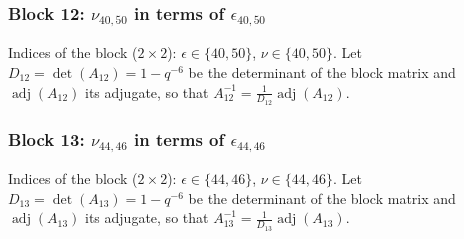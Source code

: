 \subsubsection{Block 12: $\nu_{40, 50}$ in terms of $\epsilon_{40, 50}$}
Indices of the block ($2\times 2$): $\epsilon \in \{40, 50\}$, $\nu \in \{40, 50\}$.
Let $D_{12} = \det(A_{12}) = 1-q^{-6}$ be the determinant of the block matrix and $\operatorname{adj}(A_{12})$ its adjugate, so that $A_{12}^{-1} = \frac{1}{D_{12}}\operatorname{adj}(A_{12})$.
\begin{center}
\end{center}

\subsubsection{Block 13: $\nu_{44, 46}$ in terms of $\epsilon_{44, 46}$}
Indices of the block ($2\times 2$): $\epsilon \in \{44, 46\}$, $\nu \in \{44, 46\}$.
Let $D_{13} = \det(A_{13}) = 1-q^{-6}$ be the determinant of the block matrix and $\operatorname{adj}(A_{13})$ its adjugate, so that $A_{13}^{-1} = \frac{1}{D_{13}}\operatorname{adj}(A_{13})$.
\begin{center}
\end{center}

